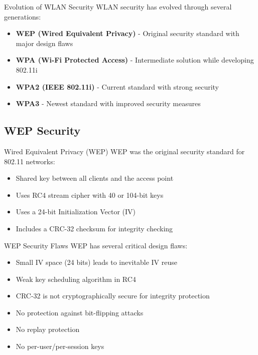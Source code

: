 \begin{concept}{Evolution of WLAN Security}
WLAN security has evolved through several generations:
\begin{itemize}
    \item \textbf{WEP (Wired Equivalent Privacy)} - Original security standard with major design flaws
    \item \textbf{WPA (Wi-Fi Protected Access)} - Intermediate solution while developing 802.11i
    \item \textbf{WPA2 (IEEE 802.11i)} - Current standard with strong security
    \item \textbf{WPA3} - Newest standard with improved security measures
\end{itemize}
\end{concept}

\subsection{WEP Security}

\begin{definition}{Wired Equivalent Privacy (WEP)}
WEP was the original security standard for 802.11 networks:
\begin{itemize}
    \item Shared key between all clients and the access point
    \item Uses RC4 stream cipher with 40 or 104-bit keys
    \item Uses a 24-bit Initialization Vector (IV)
    \item Includes a CRC-32 checksum for integrity checking
\end{itemize}
\end{definition}

\begin{theorem}{WEP Security Flaws}
WEP has several critical design flaws:
\begin{itemize}
    \item Small IV space (24 bits) leads to inevitable IV reuse
    \item Weak key scheduling algorithm in RC4
    \item CRC-32 is not cryptographically secure for integrity protection
    \item No protection against bit-flipping attacks
    \item No replay protection
    \item No per-user/per-session keys
\end{itemize}
\end{theorem}

